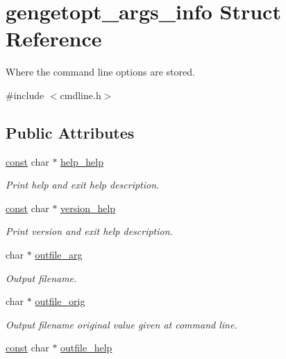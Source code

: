\hypertarget{structgengetopt__args__info}{}\section{gengetopt\+\_\+args\+\_\+info Struct Reference}
\label{structgengetopt__args__info}


Where the command line options are stored.  




{\ttfamily \#include $<$cmdline.\+h$>$}

\subsection*{Public Attributes}
\begin{DoxyCompactItemize}
\item 
\hyperlink{getopt_8c_a2c212835823e3c54a8ab6d95c652660e}{const} char $\ast$ \hyperlink{structgengetopt__args__info_afb4efa68a6f43a4d112e9b96ffe89101}{help\+\_\+help}
\begin{DoxyCompactList}\small\item\em Print help and exit help description. \end{DoxyCompactList}\item 
\hyperlink{getopt_8c_a2c212835823e3c54a8ab6d95c652660e}{const} char $\ast$ \hyperlink{structgengetopt__args__info_adef454ea6f3ff4114ae5009e58360cfc}{version\+\_\+help}
\begin{DoxyCompactList}\small\item\em Print version and exit help description. \end{DoxyCompactList}\item 
char $\ast$ \hyperlink{structgengetopt__args__info_ab9e3d63af39beb195c0ce4b30628475b}{outfile\+\_\+arg}
\begin{DoxyCompactList}\small\item\em Output filename. \end{DoxyCompactList}\item 
char $\ast$ \hyperlink{structgengetopt__args__info_a39782404c00e6f9107f8fdcae948222f}{outfile\+\_\+orig}
\begin{DoxyCompactList}\small\item\em Output filename original value given at command line. \end{DoxyCompactList}\item 
\hyperlink{getopt_8c_a2c212835823e3c54a8ab6d95c652660e}{const} char $\ast$ \hyperlink{structgengetopt__args__info_ae7d54ef8556b73161c14a77b20fe321f}{outfile\+\_\+help}

\end{DoxyCompactItemize}
